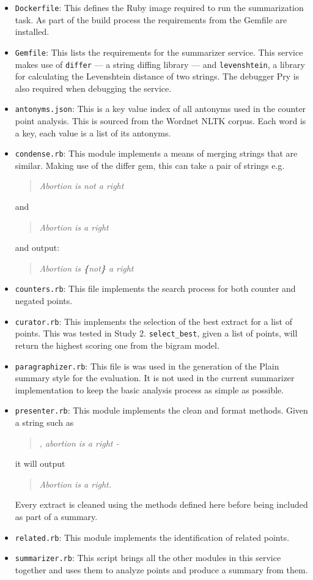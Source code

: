   \begin{itemize}
    \item
      \texttt{Dockerfile}: This defines the Ruby image required to run the summarization task. As part of the build process the requirements from the Gemfile are installed.
    \item
      \texttt{Gemfile}: This lists the requirements for the summarizer service. This service makes use of \texttt{differ} --- a string diffing library --- and \texttt{levenshtein}, a library for calculating the Levenshtein distance of two strings. The debugger Pry is also required when debugging the service.
    \item
      \texttt{antonyms.json}: This is a key value index of all antonyms used in the counter point analysis. This is sourced from the Wordnet NLTK corpus. Each word is a key, each value is a list of its antonyms.
    \item
      \texttt{condense.rb}: This module implements a means of merging strings that are similar. Making use of the differ gem, this can take a pair of strings e.g. \blockquote{\textit{Abortion is not a right}} and \blockquote{\textit{Abortion is a right}} and output: \blockquote{\textit{Abortion is \textbf{\{}not\textbf{\}} a right}}.
    \item
      \texttt{counters.rb}: This file implements the search process for both counter and negated points.
    \item
      \texttt{curator.rb}: This implements the selection of the best extract for a list of points. This was tested in Study 2. \texttt{select\_best}, given a list of points, will return the highest scoring one from the bigram model.
    \item
      \texttt{paragraphizer.rb}: This file is was used in the generation of the Plain summary style for the evaluation. It is not used in the current summarizer implementation to keep the basic analysis process as simple as possible.
    \item
      \texttt{presenter.rb}: This module implements the clean and format methods. Given a string such as \blockquote{\textit{, abortion is a right - }} it will output \blockquote{\textit{Abortion is a right.}}. Every extract is cleaned using the methods defined here before being included as part of a summary.
    \item
      \texttt{related.rb}: This module implements the identification of related points.
    \item
      \texttt{summarizer.rb}: This script brings all the other modules in this service together and uses them to analyze points and produce a summary from them.

\end{itemize}
